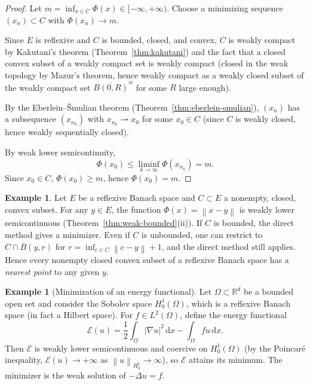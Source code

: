 \documentclass[a4paper,12pt]{book}
\newcommand{\R}{\mathbb{R}}
\newcommand{\dd}{\mathrm{d}}
\newcommand{\norm}[1]{\left\| #1 \right\|}
\newcommand{\weakto}{\rightharpoonup}
\theoremstyle{definition}
\newtheorem{example}[definition]{Example}
\theoremstyle{plain}
\theoremstyle{remark}
\begin{document}
\begin{proof}
Let $m = \inf_{x\in C}\Phi(x)\in[-\infty,+\infty)$.  Choose a minimizing
sequence $(x_n)\subset C$ with $\Phi(x_n)\to m$.

Since $E$ is reflexive and $C$ is bounded, closed, and convex, $C$ is weakly
compact by Kakutani's theorem (Theorem~\ref{thm:kakutani}) and the fact that
a closed convex subset of a weakly compact set is weakly compact (closed in
the weak topology by Mazur's theorem, hence weakly compact as a weakly closed
subset of the weakly compact set $\overline{B(0,R)}^{w}$ for some $R$ large
enough).

By the Eberlein--\v{S}mulian theorem (Theorem~\ref{thm:eberlein-smulian}),
$(x_n)$ has a subsequence $(x_{n_k})$ with $x_{n_k}\weakto x_0$ for some
$x_0\in C$ (since $C$ is weakly closed, hence weakly sequentially closed).

By weak lower semicontinuity,
\[
  \Phi(x_0) \le \liminf_{k\to\infty}\Phi(x_{n_k}) = m.
\]
Since $x_0\in C$, $\Phi(x_0)\ge m$, hence $\Phi(x_0)=m$.
\end{proof}

\begin{example}\label{ex:minimizer-norm}
Let $E$ be a reflexive Banach space and $C\subset E$ a nonempty, closed, convex
subset.  For any $y\in E$, the function $\Phi(x) = \norm{x-y}$ is weakly lower
semicontinuous (Theorem~\ref{thm:weak-bounded}(ii)).  If $C$ is bounded, the
direct method gives a minimizer.  Even if $C$ is unbounded, one can restrict
to $C\cap \overline{B}(y,r)$ for $r=\inf_{c\in C}\norm{c-y}+1$, and the
direct method still applies.  Hence every nonempty closed convex subset of a
reflexive Banach space has a \emph{nearest point} to any given $y$.
\end{example}

\begin{example}[Minimization of an energy functional]\label{ex:energy-minimizer}
Let $\Omega\subset\R^d$ be a bounded open set and consider the Sobolev space
$H^1_0(\Omega)$, which is a reflexive Banach space (in fact
a Hilbert space).  For $f\in L^2(\Omega)$, define the energy functional
\[
  \mathcal{E}(u) = \frac{1}{2}\int_\Omega |\nabla u|^2\,\dd x
  - \int_\Omega fu\,\dd x.
\]
Then $\mathcal{E}$ is weakly lower semicontinuous and coercive on $H^1_0(\Omega)$
(by the Poincar\'e inequality,
$\mathcal{E}(u)\to+\infty$ as $\norm{u}_{H^1_0}\to\infty$), so $\mathcal{E}$
attains its minimum.  The minimizer is the weak solution of $-\Delta u = f$.
\end{example}
\end{document}
